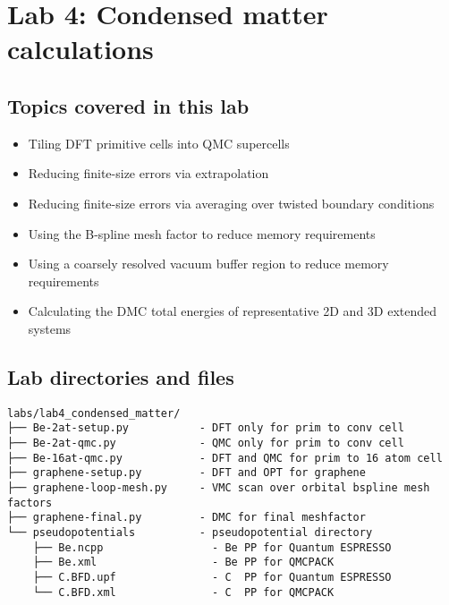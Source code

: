 \chapter{Lab 4: Condensed matter calculations} %




\section{Topics covered in this lab}
\begin{itemize}
  \item{Tiling DFT primitive cells into QMC supercells}
  \item{Reducing finite-size errors via extrapolation}
  \item{Reducing finite-size errors via averaging over twisted boundary conditions}
  \item{Using the B-spline mesh factor to reduce memory requirements}
  \item{Using a coarsely resolved vacuum buffer region to reduce memory requirements}
  \item{Calculating the DMC total energies of representative 2D and 3D extended systems}
\end{itemize}



\section{Lab directories and files}

\footnotesize
\begin{verbatim}
labs/lab4_condensed_matter/
├── Be-2at-setup.py           - DFT only for prim to conv cell
├── Be-2at-qmc.py             - QMC only for prim to conv cell
├── Be-16at-qmc.py            - DFT and QMC for prim to 16 atom cell
├── graphene-setup.py         - DFT and OPT for graphene
├── graphene-loop-mesh.py     - VMC scan over orbital bspline mesh factors
├── graphene-final.py         - DMC for final meshfactor
└── pseudopotentials          - pseudopotential directory
    ├── Be.ncpp                 - Be PP for Quantum ESPRESSO
    ├── Be.xml                  - Be PP for QMCPACK
    ├── C.BFD.upf               - C  PP for Quantum ESPRESSO
    └── C.BFD.xml               - C  PP for QMCPACK
\end{verbatim}
\normalsize

